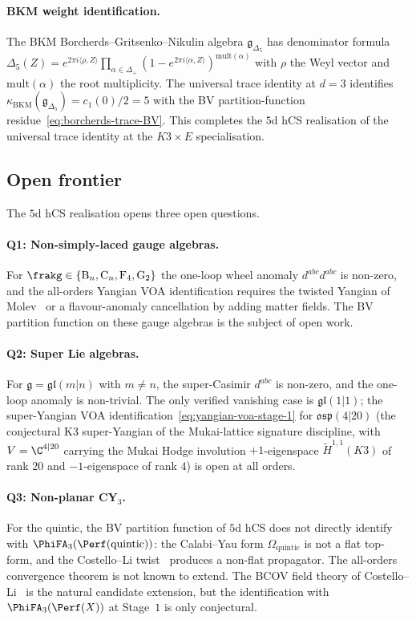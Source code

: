\paragraph{BKM weight identification.}
The BKM Borcherds--Gritsenko--Nikulin algebra
$\mathfrak{g}_{\Delta_5}$ has denominator formula
$\Delta_5(Z) = e^{2\pi i\langle\rho,Z\rangle}\prod_{\alpha\in\Delta_+}
(1 - e^{2\pi i\langle\alpha,Z\rangle})^{\mathrm{mult}(\alpha)}$
with $\rho$ the Weyl vector and $\mathrm{mult}(\alpha)$ the root
multiplicity. The universal trace identity at $d = 3$ identifies
$\kappa_{\mathrm{BKM}}(\mathfrak{g}_{\Delta_5}) = c_1(0)/2 = 5$ with
the BV partition-function residue~\eqref{eq:borcherds-trace-BV}. This
completes the $5$d hCS realisation of the universal trace identity
at the $K3\times E$ specialisation.

\subsection*{Open frontier}

The $5$d hCS realisation opens three open questions.

\paragraph{Q1: Non-simply-laced gauge algebras.}
For $\frakg \in \{\mathrm{B}_n, \mathrm{C}_n, \mathrm{F}_4, \mathrm{G}_2\}$
the one-loop wheel anomaly $d^{abc}d^{abc}$ is non-zero, and the
all-orders Yangian VOA identification requires the twisted Yangian
of Molev~\cite{Molev2007} or a flavour-anomaly cancellation by adding
matter fields. The BV partition function on these gauge algebras is
the subject of open work.

\paragraph{Q2: Super Lie algebras.}
For $\mathfrak{g} = \mathfrak{gl}(m|n)$ with $m\ne n$, the super-Casimir
$d^{abc}$ is non-zero, and the one-loop anomaly is non-trivial. The
only verified vanishing case is $\mathfrak{gl}(1|1)$; the super-Yangian
VOA identification~\eqref{eq:yangian-voa-stage-1} for
$\mathfrak{osp}(4|20)$ (the conjectural K3 super-Yangian of the
Mukai-lattice signature discipline, with
$V = \C^{4|20}$ carrying the Mukai Hodge involution
$+1$-eigenspace $\widetilde{H}^{1,1}(K3)$ of rank $20$ and $-1$-eigenspace
of rank $4$) is open at all orders.

\paragraph{Q3: Non-planar CY\texorpdfstring{$_3$}{3}.}
For the quintic, the BV partition function of $5$d hCS does not
directly identify with $\PhiFA_3(\Perf(\mathrm{quintic}))$: the
Calabi--Yau form $\Omega_{\mathrm{quintic}}$ is not a flat top-form,
and the Costello--Li twist~\cite{CostelloLi2020} produces a
non-flat propagator. The all-orders convergence theorem is not known
to extend. The BCOV field theory of Costello--Li~\cite{CostelloLi2020}
is the natural candidate extension, but the identification with
$\PhiFA_3(\Perf(X))$ at Stage~$1$ is only conjectural.

